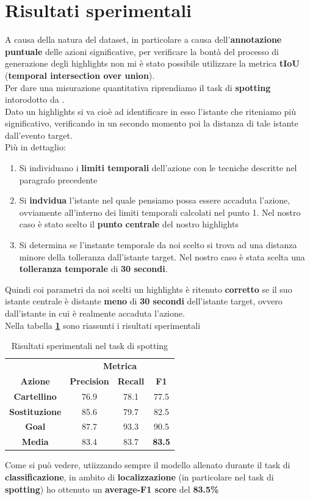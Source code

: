 \section{Risultati sperimentali}
A causa della natura del dataset, in particolare a causa dell'\textbf{annotazione puntuale} delle azioni significative, per verificare la bontà del processo di generazione degli highlights non mi è stato possibile utilizzare la metrica \textbf{tIoU} (\textbf{temporal intersection over union}).
\\Per dare una misurazione quantitativa riprendiamo il task di \textbf{spotting} intorodotto da \citet{soccerNet}.
\\Dato un highlights si va cioè ad identificare in esso l'istante che riteniamo più significativo, verificando in un secondo momento poi la distanza di tale istante dall'evento target.
\\Più in dettaglio:
\begin{enumerate}
\item Si individuano i \textbf{limiti temporali} dell'azione con le tecniche descritte nel paragrafo precedente
\item Si \textbf{indvidua} l'istante nel quale pensiamo possa essere accaduta l'azione, ovviamente all'interno dei limiti temporali calcolati nel punto 1. Nel nostro caso è stato scelto il \textbf{punto centrale} del nostro highlights
\item Si determina se l'instante temporale da noi scelto si trova ad una distanza minore della tolleranza dall'istante target. Nel nostro caso è stata scelta una \textbf{tolleranza temporale} di \textbf{30 secondi}.
\end{enumerate}
Quindi coi parametri da noi scelti un highlights è ritenuto \textbf{corretto} se il suo istante centrale è distante \textbf{meno} di \textbf{30 secondi} dell'istante target, ovvero dall'istante in cui è realmente accaduta l'azione.
\\Nella tabella \textbf{\ref{table: spotting-result}} sono riassunti i risultati sperimentali
\begin{table}[ht]
\caption{Risultati sperimentali nel task di spotting}
\centering
\begin{tabular}{c| | c|c|c}
&\multicolumn{3}{c}{\textbf{Metrica}}\\
\textbf{Azione} & \textbf{Precision} & \textbf{Recall} & \textbf{F1}  \\
\hline
\textbf{Cartellino} & 76.9 & 78.1 & 77.5\\
\textbf{Sostituzione} & 85.6 & 79.7 & 82.5 \\
\textbf{Goal} & 87.7 &  93.3 & 90.5\\
\hline
\textbf{Media} & 83.4 & 83.7 & \textbf{83.5}\\ [1ex]

\end{tabular}
\label{table: spotting-result}
\end{table}

Come si può vedere, utiizzando sempre il modello allenato durante il task di \textbf{classificazione}, in ambito di \textbf{localizzazione} (in particolare nel task di \textbf{spotting}) ho ottenuto un \textbf{average-F1 score} del \textbf{83.5\%}